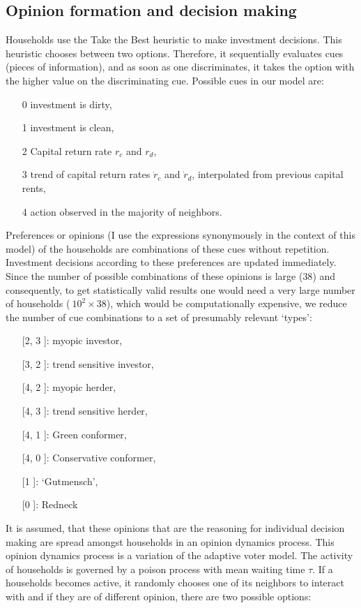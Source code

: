 \subsection{Opinion formation and decision making}
\label{sec:oppinion_formation_and_decision_making}
Households use the Take the Best heuristic to make investment decisions. This heuristic chooses between two options. Therefore, it sequentially evaluates cues (pieces of information), and as soon as one discriminates, it takes the option with the higher value on the discriminating cue. Possible cues in our model are:
\begin{itemize}
	\item[0] investment is dirty,
	\item[1] investment is clean,
	\item[2] Capital return rate $r_c$ and $r_d$,	
	\item[3] trend of capital return rates $\dot{r}_c$ and $\dot{r}_d$, interpolated from previous capital rents,
	\item[4] action observed in the majority of neighbors.
\end{itemize}
Preferences or opinions (I use the expressions synonymously in the context of this model) of the households are combinations of these cues without repetition. Investment decisions according to these preferences are updated immediately. \\
Since the number of possible combinations of these opinions is large ($38$) and consequently, to get statistically valid results one would need a very large number of households ($ ~ 10^2 \times 38$), which would be computationally expensive, we reduce the number of cue combinations to a set of presumably relevant `types':
\begin{itemize}
	\item [[2, 3]]: myopic investor,
	\item [[3, 2]]: trend sensitive investor,
	\item [[4, 2]]: myopic herder,
	\item [[4, 3]]: trend sensitive herder,
	\item [[4, 1]]: Green conformer,
	\item [[4, 0]]: Conservative conformer,
	\item [[1]]: `Gutmensch',
	\item [[0]]: Redneck
\end{itemize}
It is assumed, that these opinions that are the reasoning for individual decision making are spread amongst households in an opinion dynamics process. This opinion dynamics process is a variation of the adaptive voter model. The activity of households is governed by a poison process with mean waiting time $\tau$. If a households becomes active, it randomly chooses one of its neighbors to interact with and if they are of different opinion, there are two possible options:
